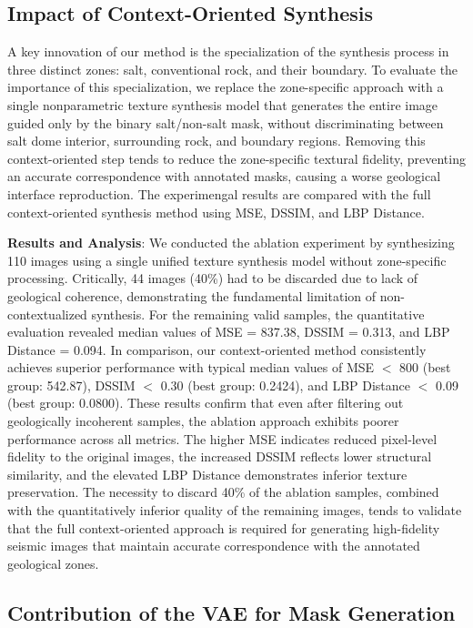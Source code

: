 \documentclass{ieeeaccess}
\begin{document}
\subsection{Impact of Context-Oriented Synthesis}

A key innovation of our method is the specialization of the synthesis process in three distinct zones: salt, conventional rock, and their boundary. To evaluate the importance of this specialization, we replace the zone-specific approach with a single nonparametric texture synthesis model that generates the entire image guided only by the binary salt/non-salt mask, without discriminating between salt dome interior, surrounding rock, and boundary regions. Removing this context-oriented step tends to reduce the zone-specific textural fidelity, preventing an accurate correspondence with annotated masks, causing a worse geological interface reproduction. The experimengal results are compared with the full context-oriented synthesis method using MSE, DSSIM, and LBP Distance.

\textbf{Results and Analysis}: We conducted the ablation experiment by synthesizing 110 images using a single unified texture synthesis model without zone-specific processing. Critically, 44 images (40\%) had to be discarded due to lack of geological coherence, demonstrating the fundamental limitation of non-contextualized synthesis. For the remaining valid samples, the quantitative evaluation revealed median values of MSE = 837.38, DSSIM = 0.313, and LBP Distance = 0.094. In comparison, our context-oriented method consistently achieves superior performance with typical median values of MSE $<$ 800 (best group: 542.87), DSSIM $<$ 0.30 (best group: 0.2424), and LBP Distance $<$ 0.09 (best group: 0.0800). These results confirm that even after filtering out geologically incoherent samples, the ablation approach exhibits poorer performance across all metrics. The higher MSE indicates reduced pixel-level fidelity to the original images, the increased DSSIM reflects lower structural similarity, and the elevated LBP Distance demonstrates inferior texture preservation. The necessity to discard 40\% of the ablation samples, combined with the quantitatively inferior quality of the remaining images, tends to validate that the full context-oriented approach is required for generating high-fidelity seismic images that maintain accurate correspondence with the annotated geological zones.

\subsection{Contribution of the VAE for Mask Generation}
\end{document}

